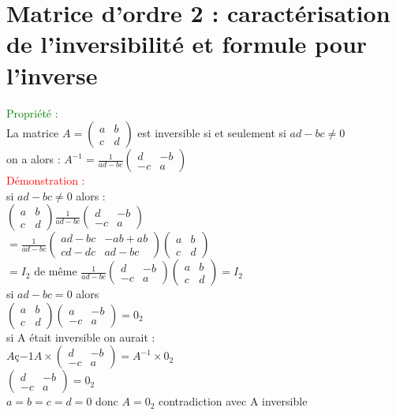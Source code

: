 \documentclass{article}
\begin{document}
	\section{ Matrice d'ordre 2 : caractérisation de l'inversibilité et formule pour l'inverse}
	\textcolor{green}{Propriété :} \\
	La matrice $A=\begin{pmatrix}
a & b \\
c & d
\end{pmatrix}$ est inversible si et seulement si $ad-bc \neq 0$ \\
 on a alors : $A^{-1}=\frac{1}{ad-bc}\begin{pmatrix}
d & -b \\
-c & a
\end{pmatrix}$ \\
\textcolor{red}{Démonstration :} \\
si $ad-bc \neq 0$ alors : \\
$\begin{pmatrix}
a & b \\
c & d
\end{pmatrix} \frac{1}{ad-bc}\begin{pmatrix}
d & -b \\
-c & a
\end{pmatrix}$  \\
$=\frac{1}{ad-bc}
\begin{pmatrix}
ad-bc & -ab+ab \\
cd-dc & ad-bc
\end{pmatrix} \begin{pmatrix}
a & b \\
c & d
\end{pmatrix}$ \\
$=I_2$ de même $\frac{1}{ad-bc}\begin{pmatrix} d & -b \\ -c & a \end{pmatrix}
\begin{pmatrix} a &b \\ c & d  \end{pmatrix} =I_2 $ \\
	si $ad-bc=0$ alors \\
	$\begin{pmatrix} a & b \\ c & d \end{pmatrix} \begin{pmatrix} a & -b \\ -c & a \end{pmatrix}=0_2$ \\
	si A était inversible on aurait : \\
	$Aç{-1} A \times \begin{pmatrix} d & -b \\ -c & a \end{pmatrix} =A^{-1} \times 0_2 $ \\
	$\begin{pmatrix} d & -b \\ -c & a \end{pmatrix}=0_2$ \\
	$a=b=c=d=0$ donc $A=0_2$ contradiction avec A inversible
\end{document}
